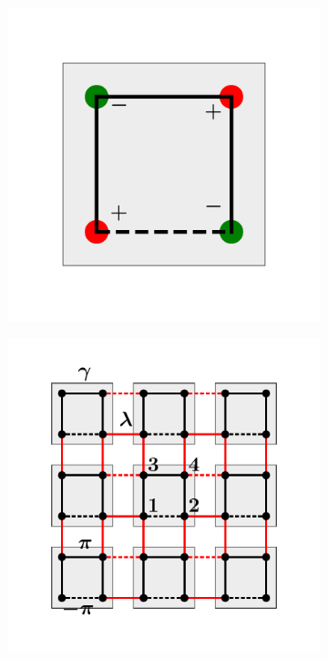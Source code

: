     
    \begin{figure}[h!]
     \centering
    \captionsetup[sub]{font=small}

     \begin{subfigure}[b!]{0.27 \textwidth}
         \caption{}
         \includegraphics[width=\textwidth]{Imagenes/Models/unitary_cell.pdf}
         \label{}
     \end{subfigure}\hspace*{-0.5em}
     \begin{subfigure}[b!]{0.27 \textwidth}
         \caption{}
         \includegraphics[width=\textwidth]{Imagenes/Models/square_hoti_model6.pdf}

\end{subfigure}
\end{figure}
